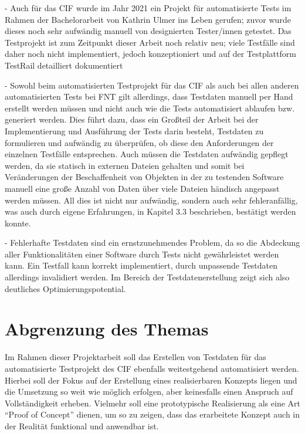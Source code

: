 - Auch für das \ac{CIF} wurde im Jahr 2021 ein Projekt für automatisierte Tests im Rahmen der Bachelorarbeit von Kathrin Ulmer ins Leben gerufen; zuvor wurde dieses noch sehr aufwändig manuell von designierten Tester/innen getestet. Das Testprojekt ist zum Zeitpunkt dieser Arbeit noch relativ neu; viele Testfälle sind daher noch nicht implementiert, jedoch konzeptioniert und auf der Testplattform TestRail detailliert dokumentiert

- Sowohl beim automatisierten Testprojekt für das \ac{CIF} als auch bei allen anderen automatisierten Tests bei FNT gilt allerdings, dass Testdaten manuell per Hand erstellt werden müssen und nicht auch wie die Tests automatisiert ablaufen bzw. generiert werden. Dies führt dazu, dass ein Großteil der Arbeit bei der Implementierung und Ausführung der Tests darin besteht, Testdaten zu formulieren und aufwändig zu überprüfen, ob diese den Anforderungen der einzelnen Testfälle entsprechen. Auch müssen die Testdaten aufwändig gepflegt werden, da sie statisch in externen Dateien gehalten und somit bei Veränderungen der Beschaffenheit von Objekten in der zu testenden Software manuell eine große Anzahl von Daten über viele Dateien händisch angepasst werden müssen. All dies ist nicht nur aufwändig, sondern auch sehr fehleranfällig, was auch durch eigene Erfahrungen, in Kapitel 3.3 beschrieben, bestätigt werden konnte.

- Fehlerhafte Testdaten sind ein ernstzunehmendes Problem, da so die Abdeckung aller Funktionalitäten einer Software durch Tests nicht gewährleistet werden kann. Ein Testfall kann korrekt implementiert, durch unpassende Testdaten allerdings invalidiert werden. Im Bereich der Testdatenerstellung zeigt sich also deutliches Optimierungspotential.

\section{Abgrenzung des Themas}\label{sec:abgrenzung}
Im Rahmen dieser Projektarbeit soll das Erstellen von Testdaten für das automatisierte Testprojekt des \ac{CIF} ebenfalls weitestgehend automatisiert werden. Hierbei soll der Fokus auf der Erstellung eines realisierbaren Konzepts liegen und die Umsetzung so weit wie möglich erfolgen, aber keinesfalls einen Anspruch auf Vollständigkeit erheben. Vielmehr soll eine prototypische Realisierung als eine Art \enquote{Proof of Concept} dienen, um so zu zeigen, dass das erarbeitete Konzept auch in der Realität funktional und anwendbar ist. \cite{oed:2021}

